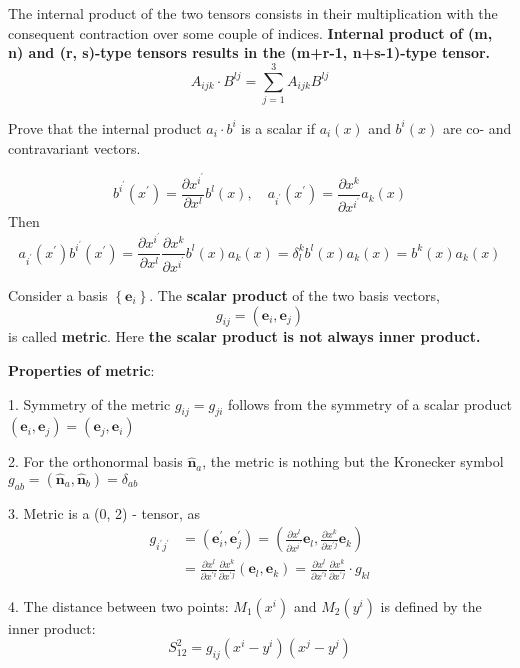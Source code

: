 The internal product of the two tensors consists in their multiplication with the consequent contraction over some couple of indices. \textbf{Internal product of (m, n) and (r, s)-type tensors results in the (m+r-1, n+s-1)-type tensor.}
\begin{equation}
A_{i j k} \cdot B^{l j}=\sum_{j=1}^{3} A_{i j k} B^{l j}
\end{equation}
\begin{example}
Prove that the internal product $a_{i} \cdot b^{i}$ is a scalar if $a_{i}(x)$ and $b^{i}(x)$ are co- and contravariant vectors.

$$
b^{i^{\prime}}\left(x^{\prime}\right)=\frac{\partial x^{i^{\prime}}}{\partial x^{l}} b^{l}(x), \quad a_{i^{\prime}}\left(x^{\prime}\right)=\frac{\partial x^{k}}{\partial x^{i^{\prime}}} a_{k}(x)
$$
Then
$$
a_{i^{\prime}}\left(x^{\prime}\right) b^{i^{\prime}}\left(x^{\prime}\right)=\frac{\partial x^{i^{\prime}}}{\partial x^{l}} \frac{\partial x^{k}}{\partial x^{i^{\prime}}} b^{l}(x) a_{k}(x)=\delta_{l}^{k} b^{l}(x) a_{k}(x)=b^{k}(x) a_{k}(x)
$$
\end{example}
\begin{defi}
        Consider a basis $\left\{\mathbf{e}_{i}\right\} .$ The \textbf{scalar product} of the two basis vectors,
        \begin{equation}
g_{i j}=\left(\mathbf{e}_{i}, \mathbf{e}_{j}\right)
\end{equation}
is called \textbf{metric}. Here \textbf{the scalar product is not always inner product.}
\end{defi}
\begin{qt}
\textbf{Properties of metric}:

1. Symmetry of the metric $g_{i j}=g_{j i}$ follows from the symmetry of a scalar product $\left(\mathbf{e}_{i}, \mathbf{e}_{j}\right)=\left(\mathbf{e}_{j}, \mathbf{e}_{i}\right)$

2. For the orthonormal basis $\hat{\mathbf{n}}_{a}$, the metric is nothing but the Kronecker symbol $g_{a b}=\left(\hat{\mathbf{n}}_{a}, \hat{\mathbf{n}}_{b}\right)=\delta_{a b}$

3. Metric is a (0, 2) - tensor, as
$$
\begin{aligned}
g_{i^{\prime} j^{\prime}} &=\left(\mathbf{e}_{i}^{\prime}, \mathbf{e}_{j}^{\prime}\right)=\left(\frac{\partial x^{l}}{\partial x^{i^{\prime}}} \mathbf{e}_{l}, \frac{\partial x^{k}}{\partial x^{\prime j}} \mathbf{e}_{k}\right) \\
&=\frac{\partial x^{l}}{\partial x^{\prime i}} \frac{\partial x^{k}}{\partial x^{\prime j}}\left(\mathbf{e}_{l}, \mathbf{e}_{k}\right)=\frac{\partial x^{l}}{\partial x^{\prime i}} \frac{\partial x^{k}}{\partial x^{\prime j}} \cdot g_{k l}
\end{aligned}
$$

4. The distance between two points: $M_{1}\left(x^{i}\right)$ and $M_{2}\left(y^{i}\right)$ is defined by the inner product:
$$
S_{12}^{2}=g_{i j}\left(x^{i}-y^{i}\right)\left(x^{j}-y^{j}\right)
$$
\end{qt}

